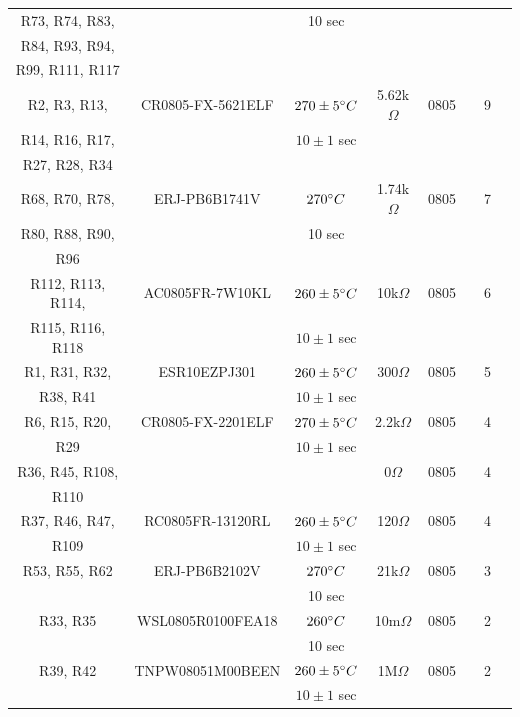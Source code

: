 \documentclass[10pt]{datasheet}
\begin{document}
\begin{longtable}{| c | c | c | c | c | c | c | c |}
    R73, R74, R83, & & 10 sec & & & & &\\
    R84, R93, R94, & & & & & & &\\
    R99, R111, R117 & & & & & & &\\
    \hline
    R2, R3, R13, & CR0805-FX-5621ELF & $270\pm 5\degree C$ & 5.62k$\Omega$ & 0805 & \cite{ref31} & 9 &\\
    R14, R16, R17, & & $10\pm 1$ sec & & & & &\\
    R27, R28, R34 & & & & & & &\\
    \hline
    R68, R70, R78, & ERJ-PB6B1741V & $270\degree C$ & 1.74k$\Omega$ & 0805 & \cite{ref28} & 7 &\\
    R80, R88, R90, & & 10 sec & & & & &\\
    R96 & & & & & & &\\
    \hline
    R112, R113, R114, & AC0805FR-7W10KL & $260\pm 5\degree C$ & 10k$\Omega$ & 0805 & \cite{ref30} & 6 &\\
    R115, R116, R118 & & $10\pm 1$ sec & & & & &\\
    \hline
    R1, R31, R32, & ESR10EZPJ301 & $260\pm 5\degree C$ & 300$\Omega$ & 0805 & \cite{ref32} & 5 &\\
    R38, R41 & & $10\pm 1$ sec & & & & &\\
    \hline
    R6, R15, R20, & CR0805-FX-2201ELF & $270\pm 5\degree C$ & 2.2k$\Omega$ & 0805 & \cite{ref31} & 4 &\\
    R29 & & $10\pm 1$ sec & & & & &\\
    \hline
    R36, R45, R108, & & & 0$\Omega$ & 0805 & & 4 &\\
    R110 & & & & & & &\\
    \hline
    R37, R46, R47, & RC0805FR-13120RL & $260\pm 5\degree C$ & 120$\Omega$ & 0805 & \cite{ref33} & 4 &\\
    R109 & & $10\pm 1$ sec & & & & &\\
    \hline
    R53, R55, R62 & ERJ-PB6B2102V & $270\degree C$ & 21k$\Omega$ & 0805 & \cite{ref28} & 3 &\\
    & & 10 sec & & & & &\\
    \hline
    R33, R35 & WSL0805R0100FEA18 & $260\degree C$ & 10m$\Omega$ & 0805 & \cite{ref34} & 2 &\\
    & & 10 sec & & & & &\\
    \hline
    R39, R42 & TNPW08051M00BEEN & $260\pm 5\degree C$ & 1M$\Omega$ & 0805 & \cite{ref35} & 2 &\\
    & & $10\pm 1$ sec & & & & &\\

\end{longtable}
\end{document}
